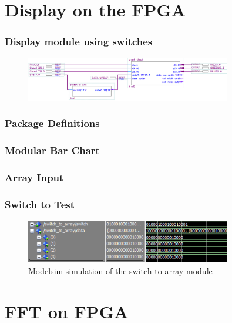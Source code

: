 \documentclass{beamer}
\begin{document}
\section{Display on the FPGA}
\begin{frame}\frametitle{Display module using switches}
  \begin{figure}[!htb]
    \centering
    \includegraphics[width=0.8\textwidth]{switch_circuit.PNG}
  \end{figure}
\end{frame}


\begin{frame}\frametitle{Package Definitions}

\end{frame}

\begin{frame}\frametitle{Modular Bar Chart}

\end{frame}

\begin{frame}\frametitle{Array Input}

\end{frame}

\begin{frame}\frametitle{Switch to Test}

\begin{figure}[!htb]
  \centering
  \includegraphics[width=0.8\textwidth]{switch_sim.PNG}
  \caption{Modelsim simulation of the switch to array module}
  \label{fig:switch_sim}
\end{figure}
\end{frame}

\section{FFT on FPGA}
\end{document}
